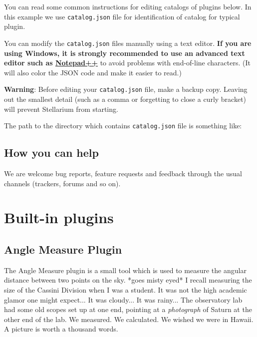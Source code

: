 You can read some common instructions for editing catalogs of plugins
below. In this example we use \texttt{catalog.json} file for
identification of catalog for typical plugin.

You can modify the \texttt{catalog.json} files manually using a text
editor. \textbf{If you are using Windows, it is strongly recommended to
use an advanced text editor such as
\href{http://notepad-plus-plus.org/}{Notepad++}} to avoid problems with
end-of-line characters. (It will also color the JSON code and make it
easier to read.)

\textbf{Warning}: Before editing your \texttt{catalog.json} file, make a
backup copy. Leaving out the smallest detail (such as a comma or
forgetting to close a curly bracket) will prevent Stellarium from
starting.

The path to the directory which contains \texttt{catalog.json} file is
something like:

\section{How you can help}\label{how-you-can-help}

We are welcome bug reports, feature requests and feedback through the
usual channels (trackers, forums and so on).


\chapter{Built-in plugins}\label{built-in-plugins}

\section{Angle Measure Plugin}\label{angle-measure-plugin}


The Angle Measure plugin is a small tool which is used to measure the
angular distance between two points on the sky. *goes misty eyed* I
recall measuring the size of the Cassini Division when I was a student.
It was not the high academic glamor one might expect... It was cloudy...
It was rainy... The observatory lab had some old scopes set up at one
end, pointing at a \emph{photograph} of Saturn at the other end of the
lab. We measured. We calculated. We wished we were in Hawaii. A picture
is worth a thousand words.

